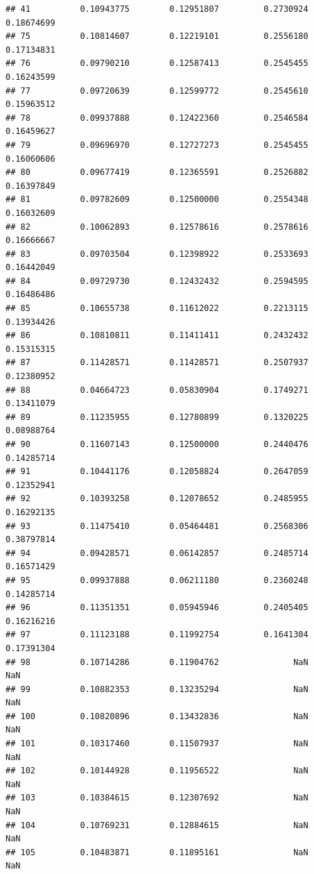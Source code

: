 \documentclass[]{article}
\begin{document}
\begin{verbatim}
## 41          0.10943775        0.12951807         0.2730924          0.18674699
## 75          0.10814607        0.12219101         0.2556180          0.17134831
## 76          0.09790210        0.12587413         0.2545455          0.16243599
## 77          0.09720639        0.12599772         0.2545610          0.15963512
## 78          0.09937888        0.12422360         0.2546584          0.16459627
## 79          0.09696970        0.12727273         0.2545455          0.16060606
## 80          0.09677419        0.12365591         0.2526882          0.16397849
## 81          0.09782609        0.12500000         0.2554348          0.16032609
## 82          0.10062893        0.12578616         0.2578616          0.16666667
## 83          0.09703504        0.12398922         0.2533693          0.16442049
## 84          0.09729730        0.12432432         0.2594595          0.16486486
## 85          0.10655738        0.11612022         0.2213115          0.13934426
## 86          0.10810811        0.11411411         0.2432432          0.15315315
## 87          0.11428571        0.11428571         0.2507937          0.12380952
## 88          0.04664723        0.05830904         0.1749271          0.13411079
## 89          0.11235955        0.12780899         0.1320225          0.08988764
## 90          0.11607143        0.12500000         0.2440476          0.14285714
## 91          0.10441176        0.12058824         0.2647059          0.12352941
## 92          0.10393258        0.12078652         0.2485955          0.16292135
## 93          0.11475410        0.05464481         0.2568306          0.38797814
## 94          0.09428571        0.06142857         0.2485714          0.16571429
## 95          0.09937888        0.06211180         0.2360248          0.14285714
## 96          0.11351351        0.05945946         0.2405405          0.16216216
## 97          0.11123188        0.11992754         0.1641304          0.17391304
## 98          0.10714286        0.11904762               NaN                 NaN
## 99          0.10882353        0.13235294               NaN                 NaN
## 100         0.10820896        0.13432836               NaN                 NaN
## 101         0.10317460        0.11507937               NaN                 NaN
## 102         0.10144928        0.11956522               NaN                 NaN
## 103         0.10384615        0.12307692               NaN                 NaN
## 104         0.10769231        0.12884615               NaN                 NaN
## 105         0.10483871        0.11895161               NaN                 NaN

\end{verbatim}
\end{document}
